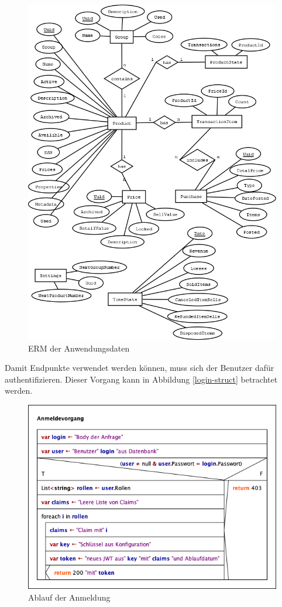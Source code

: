 \begin{figure}[ht]
	\centering
	\includegraphics[width=1\linewidth]{ERM.png}
	\caption{ERM der Anwendungsdaten}
	\label{data-erm}
\end{figure}

Damit Endpunkte verwendet werden können, muss sich der Benutzer dafür authentifizieren. Dieser Vorgang kann in Abbildung \vref{login-struct} betrachtet werden.

\begin{figure}[ht]
	\centering
	\includegraphics[width=0.7\linewidth]{Anmeldevorgang.png}
	\caption{Ablauf der Anmeldung}
	\label{login-struct}
\end{figure}